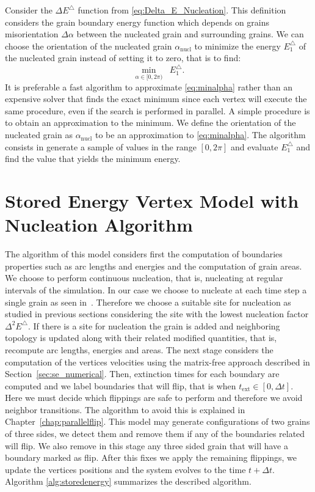 Consider the $\Delta E^{\triangle}$ function from \eqref{eq:Delta_E_Nucleation}.
This definition considers the grain boundary energy function which depends on grains misorientation $\Delta \alpha$ between the nucleated grain and surrounding grains. 
We can choose the orientation of the nucleated grain $\alpha_{\text{nucl}}$ to minimize the energy $E_1^{\triangle}$ of the nucleated grain instead of setting it to zero, that is to find:
\begin{equation}
\min_{\alpha \in [0, 2\pi)} \;\; E_1^{\triangle}.
    \label{eq:minalpha}
\end{equation}
It is preferable a fast algorithm to approximate \eqref{eq:minalpha} rather than an expensive solver that finds the exact minimum since each vertex will execute the same procedure, even if the search is performed in parallel. 
A simple procedure is to obtain an approximation to the minimum. 
We define the orientation of the nucleated grain as $\alpha_{\text{nucl}}$ to be an approximation to \eqref{eq:minalpha}.
The algorithm consists in generate a sample of values in the range $[0, 2\pi]$ and evaluate $E_1^{\triangle}$ and find the value that yields the minimum energy.

\section{Stored Energy Vertex Model with Nucleation Algorithm}

The algorithm of this model considers first the computation of boundaries properties such as arc lengths and energies and the computation of grain areas. 
We choose to perform continuous nucleation, that is, nucleating at regular intervals of the simulation. 
In our case we choose to nucleate at each time step a single grain as seen in~\cite{raabe2006continuum}. 
Therefore we choose a suitable site for nucleation as studied in previous sections considering the site with the lowest nucleation factor $\Delta^2E^{\triangle}$. 
If there is a site for nucleation the grain is added and neighboring topology is updated along with their related modified quantities, that is, recompute arc lengths, energies and areas. 
The next stage considers the computation of the vertices velocities using the matrix-free approach described in Section~\ref{sec:se_numerical}. Then, extinction times for each boundary are computed and we label boundaries that will flip, that is when $t_{\text{ext}} \in[0,\Delta t]$. 
Here we must decide which flippings are safe to perform and therefore we avoid  neighbor transitions. 
The algorithm to avoid this is explained in Chapter~\ref{chap:parallelflip}.
This model may generate configurations of two grains of three sides, we detect them and remove them if any of the boundaries related will flip. 
We also remove in this stage any three sided grain that will have a boundary marked as flip. 
After this fixes we apply the remaining flippings, we update the vertices positions and the system evolves to the time $t+\Delta t$. Algorithm \ref{alg:storedenergy} summarizes the described algorithm.

